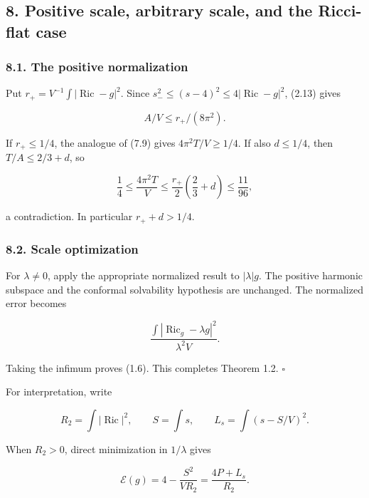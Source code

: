 \documentclass[
  10pt,
]{article}
\begin{document}
\hypertarget{positive-scale-arbitrary-scale-and-the-ricci-flat-case}{%
\subsection{8. Positive scale, arbitrary scale, and the Ricci-flat
case}\label{positive-scale-arbitrary-scale-and-the-ricci-flat-case}}

\hypertarget{the-positive-normalization}{%
\subsubsection{8.1. The positive
normalization}\label{the-positive-normalization}}

Put \(r_+=V^{-1}\int|\operatorname{Ric}-g|^2\). Since
\(s_-^2\le(s-4)^2\le4|\operatorname{Ric}-g|^2\), (2.13) gives

\[
                            A/V\le r_+/(8\pi^2).
\]

If \(r_+\le1/4\), the analogue of (7.9) gives \(4\pi^2T/V\ge1/4\). If
also \(d\le1/4\), then \(T/A\le2/3+d\), so

\[
  \frac14\le\frac{4\pi^2T}{V}
             \le\frac{r_+}{2}\left(\frac23+d\right)
             \le\frac{11}{96},
\]

a contradiction. In particular \(r_++d>1/4\).

\hypertarget{scale-optimization}{%
\subsubsection{8.2. Scale optimization}\label{scale-optimization}}

For \(\lambda\ne0\), apply the appropriate normalized result to
\(|\lambda|g\). The positive harmonic subspace and the conformal
solvability hypothesis are unchanged. The normalized error becomes

\[
 \frac{\int|\operatorname{Ric}_g-\lambda g|^2}{\lambda^2V}.
\]

Taking the infimum proves (1.6). This completes Theorem 1.2. \(\square\)

For interpretation, write

\[
 R_2=\int|\operatorname{Ric}|^2,\qquad S=\int s,\qquad
 L_s=\int(s-S/V)^2.
\]

When \(R_2>0\), direct minimization in \(1/\lambda\) gives

\[
              \mathcal E(g)=4-\frac{S^2}{VR_2}
                             =\frac{4P+L_s}{R_2}.        \tag{8.1}
\]
\end{document}
